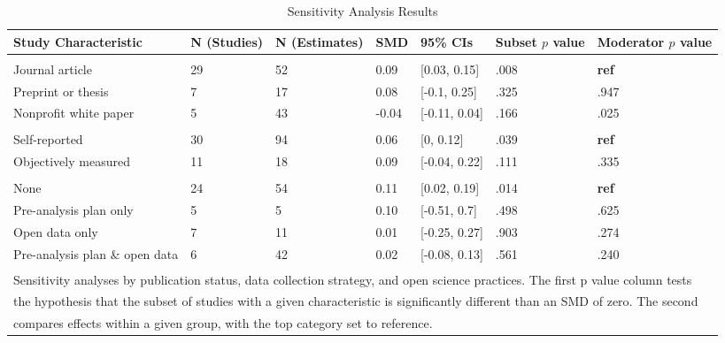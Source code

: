 \documentclass[sn-nature,referee,pdflatex]{sn-jnl}
\begin{document}
\begin{table}[!ht]
\centering
\caption{\label{tab:table_three}Sensitivity Analysis Results}
\centering
\begin{tabular}[t]{lllllll}
\toprule
Study Characteristic & N (Studies) & N (Estimates) & SMD & 95\% CIs & Subset $p$ value & Moderator $p$ value\\
\midrule
\addlinespace[0.3em]
\multicolumn{7}{l}{\textbf{Publication Status}}\\
\hspace{1em}Journal article & 29 & 52 & 0.09 & {}[0.03, 0.15] & .008 & \textbf{ref}\\
\hspace{1em}Preprint or thesis & 7 & 17 & 0.08 & {}[-0.1, 0.25] & .325 & .947\\
\hspace{1em}Nonprofit white paper & 5 & 43 & -0.04 & {}[-0.11, 0.04] & .166 & .025\\
\addlinespace[0.3em]
\multicolumn{7}{l}{\textbf{Data Collection Strategy}}\\
\hspace{1em}Self-reported & 30 & 94 & 0.06 & {}[0, 0.12] & .039 & \textbf{ref}\\
\hspace{1em}Objectively measured & 11 & 18 & 0.09 & {}[-0.04, 0.22] & .111 & .335\\
\addlinespace[0.3em]
\multicolumn{7}{l}{\textbf{Open Science}}\\
\hspace{1em}None & 24 & 54 & 0.11 & {}[0.02, 0.19] & .014 & \textbf{ref}\\
\hspace{1em}Pre-analysis plan only & 5 & 5 & 0.10 & {}[-0.51, 0.7] & .498 & .625\\
\hspace{1em}Open data only & 7 & 11 & 0.01 & {}[-0.25, 0.27] & .903 & .274\\
\hspace{1em}Pre-analysis plan \& open data & 6 & 42 & 0.02 & {}[-0.08, 0.13] & .561 & .240\\
\bottomrule
\multicolumn{7}{l}{\textsuperscript{} Sensitivity analyses by publication status, data collection strategy, and open science practices. The first p value column tests}\\
\multicolumn{7}{l}{the hypothesis that the subset of studies with a given characteristic is significantly different than an SMD of zero. The second}\\
\multicolumn{7}{l}{compares effects within a given group, with the top category set to reference.}\\
\end{tabular}
\end{table}
\end{document}
